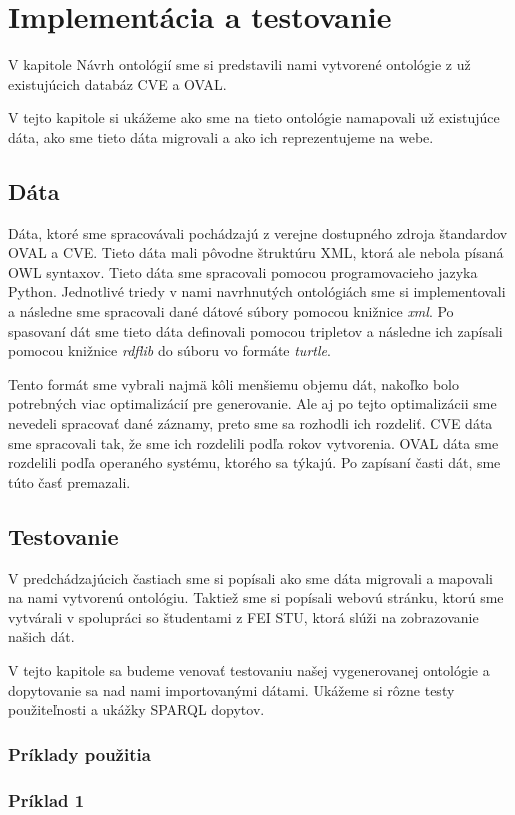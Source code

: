 \documentclass[12pt, a4paper, oneside]{book}
\begin{document}
\chapter{Implementácia a testovanie}
V kapitole Návrh ontológií sme si predstavili nami vytvorené ontológie z už existujúcich databáz CVE a OVAL.


V tejto kapitole si ukážeme ako sme na tieto ontológie namapovali už existujúce dáta, ako sme tieto dáta migrovali a ako ich reprezentujeme na webe. 
\section{Dáta}
Dáta, ktoré sme spracovávali pochádzajú z verejne dostupného zdroja štandardov OVAL a CVE. Tieto dáta mali pôvodne štruktúru XML, ktorá ale nebola písaná OWL syntaxov. Tieto dáta sme spracovali pomocou programovacieho jazyka Python. Jednotlivé triedy v nami navrhnutých ontológiách sme si implementovali a následne sme spracovali dané dátové súbory pomocou knižnice \textit{xml}. Po spasovaní dát sme tieto dáta definovali pomocou tripletov a následne ich zapísali pomocou knižnice \textit{rdflib} do súboru vo formáte \textit{turtle}. 


Tento formát sme vybrali najmä kôli menšiemu objemu dát, nakoľko bolo potrebných viac optimalizácií pre generovanie. Ale aj po tejto optimalizácii sme nevedeli spracovať dané záznamy, preto sme sa  rozhodli ich rozdeliť. CVE dáta sme spracovali tak, že sme ich rozdelili podľa rokov vytvorenia. OVAL dáta sme rozdelili podľa operaného systému, ktorého sa týkajú. Po zapísaní časti dát, sme túto časť premazali.


\section{Testovanie}
V predchádzajúcich častiach sme si popísali ako sme dáta migrovali a mapovali na nami vytvorenú ontológiu. Taktiež sme si popísali webovú stránku, ktorú sme vytvárali v spolupráci so študentami z FEI STU, ktorá slúži na zobrazovanie našich dát.


V tejto kapitole sa budeme venovať testovaniu našej vygenerovanej ontológie a dopytovanie sa nad nami importovanými dátami. Ukážeme si rôzne testy použiteľnosti a ukážky SPARQL dopytov.


\subsection{Príklady použitia}
\subsection*{Príklad 1}
\label{sec:priklad1}
\end{document}
